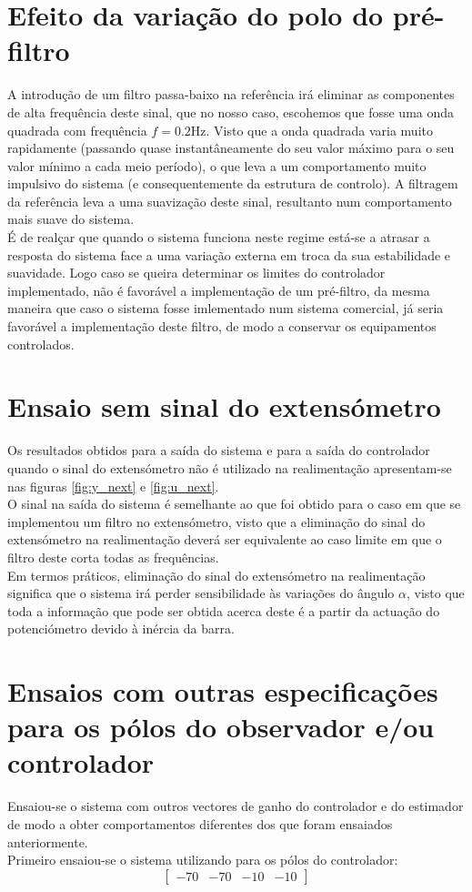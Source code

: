 \documentclass[%
  reprint,
  nofootinbib,
  amsmath,amssymb,
  aps,
  10pt,
  a4paper
]{revtex4-1}
\begin{document}
\section{Efeito da variação do polo do pré-filtro}
A introdução de um filtro passa-baixo na referência irá eliminar as componentes de alta frequência deste sinal, que no nosso caso, escohemos que fosse uma onda quadrada com frequência $f=0.2$Hz. Visto que a onda quadrada varia muito rapidamente (passando quase instantâneamente do seu valor máximo para o seu valor mínimo a cada meio período), o que leva a um comportamento muito impulsivo do sistema (e consequentemente da estrutura de controlo). A filtragem da referência leva a uma suavização deste sinal, resultanto num comportamento mais suave do sistema.\\
É de realçar que quando o sistema funciona neste regime está-se a atrasar a resposta do sistema face a uma variação externa em troca da sua estabilidade e suavidade. Logo caso se queira determinar os limites do controlador implementado, não é favorável a implementação de um pré-filtro, da mesma maneira que caso o sistema fosse imlementado num sistema comercial, já seria favorável a implementação deste filtro, de modo a conservar os equipamentos controlados.
\section{Ensaio sem sinal do extensómetro}
Os resultados obtidos para a saída do sistema e para a saída do controlador quando o sinal do extensómetro não é utilizado na realimentação apresentam-se nas figuras \ref{fig:y_next} e \ref{fig:u_next}.\\
O sinal na saída do sistema é semelhante ao que foi obtido para o caso em que se implementou um filtro no extensómetro, visto que a eliminação do sinal do extensómetro na realimentação deverá ser equivalente ao caso limite em que o filtro deste corta todas as frequências.\\
Em termos práticos, eliminação do sinal do extensómetro na realimentação significa que o sistema irá perder sensibilidade às variações do ângulo $\alpha$, visto que toda a informação que pode ser obtida acerca deste é a partir da actuação do potenciómetro devido à inércia da barra.
\section{Ensaios com outras especificações para os pólos do observador e/ou controlador}
Ensaiou-se o sistema com outros vectores de ganho do controlador e do estimador de modo a obter comportamentos diferentes dos que foram ensaiados anteriormente.\\
Primeiro ensaiou-se o sistema utilizando para os pólos do controlador:
\begin{equation}
\begin{bmatrix}
-70 & -70  & -10 &-10
\end{bmatrix}
\end{equation}
\end{document}

